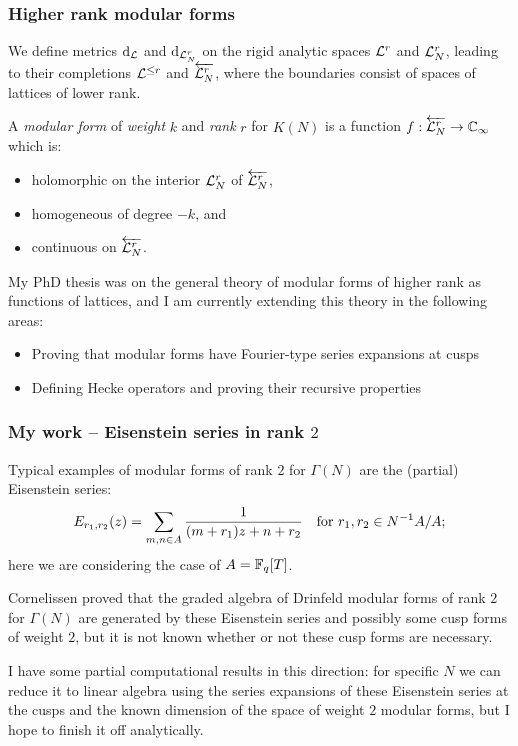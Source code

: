 \begin{frame} \frametitle{Higher rank modular forms} \pause
  We define metrics $\operatorname{d}_{\mathcal{L}}$ and $\operatorname{d}_{\mathcal{L}_N^r}$ on the rigid analytic spaces $\mathcal{L}^r$ and $\mathcal{L}_N^r$, leading to their completions $\mathcal{L}^{\leq r}$ and $\protect\overleftarrow{\mathcal{L}_{N}^{r}}$, where the boundaries consist of spaces of lattices of lower rank. \pause
  \begin{definition} \label{def:strongMForm}
    A \emph{modular form} of \emph{weight} $k$ and \emph{rank} $r$ for $K(N)$ is a function $f : \protect\overleftarrow{\mathcal{L}_{N}^{r}} \to \mathbb{C}_\infty$ which is: \pause
    \begin{itemize}
      \item holomorphic on the interior $\mathcal{L}_N^r$ of $\protect\overleftarrow{\mathcal{L}_{N}^{r}}$\pause,
      \item homogeneous of degree $-k$\pause, and
      \item continuous on $\protect\overleftarrow{\mathcal{L}_{N}^{r}}$. \pause
    \end{itemize}
  \end{definition}


  My PhD thesis was on the general theory of modular forms of higher rank as functions of lattices, and I am currently extending this theory in the following areas: \pause
  \begin{itemize}
    \item Proving that modular forms have Fourier-type series expansions at cusps \pause
    \item Defining Hecke operators and proving their recursive properties
  \end{itemize}
\end{frame}


\begin{frame} \frametitle{My work -- Eisenstein series in rank $2$} \pause
  Typical examples of modular forms of rank $2$ for $\Gamma(N)$ are the (partial) Eisenstein series:
  \[ E_{r_1,r_2}(z) = \sum_{m,n \in A} \frac{1}{(m+r_1)z+n+r_2} \quad\text{for}\  r_1,r_2 \in N^{-1}A/A; \]
  here we are considering the case of $A = \mathbb{F}_q[T]$. \pause

  Cornelissen proved that the graded algebra of Drinfeld modular forms of rank $2$ for $\Gamma(N)$ are generated by these Eisenstein series and possibly some cusp forms of weight $2$, but it is not known whether or not these cusp forms are necessary. \pause
  
  I have some partial computational results in this direction: for specific $N$ we can reduce it to linear algebra using the series expansions of these Eisenstein series at the cusps and the known dimension of the space of weight $2$ modular forms, but I hope to finish it off analytically.
\end{frame}